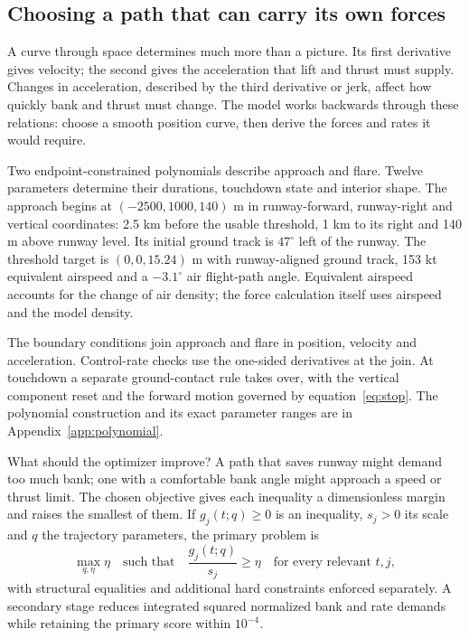 \subsection*{Choosing a path that can carry its own forces}
A curve through space determines much more than a picture. Its first derivative gives velocity; the second gives the acceleration that lift and thrust must supply. Changes in acceleration, described by the third derivative or jerk, affect how quickly bank and thrust must change. The model works backwards through these relations: choose a smooth position curve, then derive the forces and rates it would require.

Two endpoint-constrained polynomials describe approach and flare. Twelve parameters determine their durations, touchdown state and interior shape. The approach begins at $(-2500,1000,140)$ m in runway-forward, runway-right and vertical coordinates: 2.5 km before the usable threshold, 1 km to its right and 140 m above runway level. Its initial ground track is $47^\circ$ left of the runway. The threshold target is $(0,0,15.24)$ m with runway-aligned ground track, 153 kt equivalent airspeed and a $-3.1^\circ$ air flight-path angle. Equivalent airspeed accounts for the change of air density; the force calculation itself uses airspeed and the model density.

The boundary conditions join approach and flare in position, velocity and acceleration. Control-rate checks use the one-sided derivatives at the join. At touchdown a separate ground-contact rule takes over, with the vertical component reset and the forward motion governed by equation~\eqref{eq:stop}. The polynomial construction and its exact parameter ranges are in Appendix~\ref{app:polynomial}.

What should the optimizer improve? A path that saves runway might demand too much bank; one with a comfortable bank angle might approach a speed or thrust limit. The chosen objective gives each inequality a dimensionless margin and raises the smallest of them. If $g_j(t;q)\geq0$ is an inequality, $s_j>0$ its scale and $q$ the trajectory parameters, the primary problem is
\begin{equation}
\max_{q,\eta}\eta\quad\text{such that}\quad
\frac{g_j(t;q)}{s_j}\geq\eta\quad\text{for every relevant }t,j,
\label{eq:objective}
\end{equation}
with structural equalities and additional hard constraints enforced separately. A secondary stage reduces integrated squared normalized bank and rate demands while retaining the primary score within $10^{-4}$.

